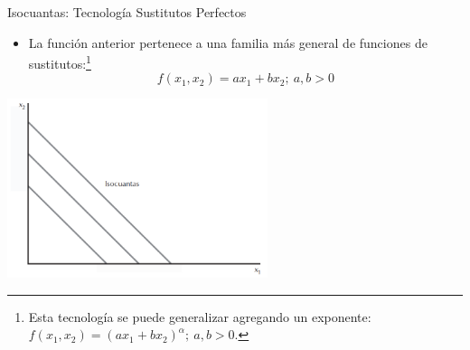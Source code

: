 \documentclass{beamer}
\theoremstyle{definition}
\begin{document}
\begin{frame}{Isocuantas: Tecnolog\'ia Sustitutos Perfectos}
	\begin{itemize}
		\item La función anterior pertenece a una familia más general de funciones de sustitutos:\footnote{Esta tecnología se puede generalizar agregando un exponente: $f(x_{1},x_{2})=\left( ax_{1}+bx_{2}\right)^{\alpha}; \ a,b>0$.} $$f(x_{1},x_{2})=ax_{1}+bx_{2}; \ a,b>0$$
	\end{itemize}
\begin{center}
\includegraphics[width=3in]{figures2/sustitutos.png}
\end{center}
\end{frame}
\end{document}
